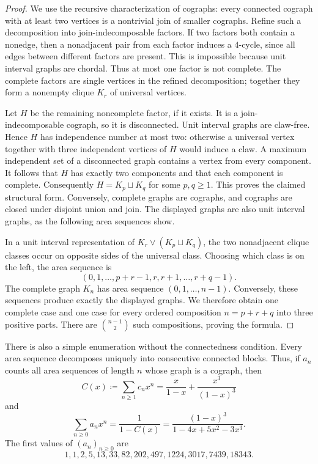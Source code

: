 \begin{proof}
We use the recursive characterization of cographs: every connected cograph
with at least two vertices is a nontrivial join of smaller cographs.  Refine
such a decomposition into join-indecomposable factors.  If two factors both
contain a nonedge, then a nonadjacent pair from each factor induces a
$4$-cycle, since all edges between different factors are present.  This is
impossible because unit interval graphs are chordal.  Thus at most one factor
is not complete.  The complete factors are single vertices in the refined
decomposition; together they form a nonempty clique $K_r$ of universal
vertices.

Let $H$ be the remaining noncomplete factor, if it exists.  It is a
join-indecomposable cograph, so it is disconnected.  Unit interval graphs are
claw-free.  Hence $H$ has independence number at most two: otherwise a
universal vertex together with three independent vertices of $H$ would induce
a claw.  A maximum independent set of a disconnected graph contains a vertex
from every component.  It follows that $H$ has exactly two components and
that each component is complete.  Consequently
$H=K_p\sqcup K_q$ for some $p,q\geq1$.  This proves the claimed structural
form.  Conversely, complete graphs are cographs, and cographs are closed
under disjoint union and join.  The displayed graphs are also unit interval
graphs, as the following area sequences show.

In a unit interval representation of
$K_r\vee(K_p\sqcup K_q)$, the two nonadjacent clique classes occur on
opposite sides of the universal class.  Choosing which class is on the left,
the area sequence is
\[
(0,1,\dotsc,p+r-1,r,r+1,\dotsc,r+q-1).
\]
The complete graph $K_n$ has area sequence $(0,1,\dotsc,n-1)$.  Conversely,
these sequences produce exactly the displayed graphs.  We therefore obtain
one complete case and one case for every ordered composition
$n=p+r+q$ into three positive parts.  There are
$\binom{n-1}{2}$ such compositions, proving the formula.
\end{proof}

There is also a simple enumeration without the connectedness condition.
Every area sequence decomposes uniquely into consecutive connected blocks.
Thus, if $a_n$ counts all area sequences of length $n$ whose graph is a
cograph, then
\[
C(x)\coloneqq\sum_{n\geq1}c_nx^n
=\frac{x}{1-x}+\frac{x^3}{(1-x)^3}
\]
and
\[
\sum_{n\geq0}a_nx^n
=\frac{1}{1-C(x)}
=\frac{(1-x)^3}{1-4x+5x^2-3x^3}.
\]
The first values of $(a_n)_{n\geq0}$ are
\[
1,1,2,5,13,33,82,202,497,1224,3017,7439,18343.
\]


